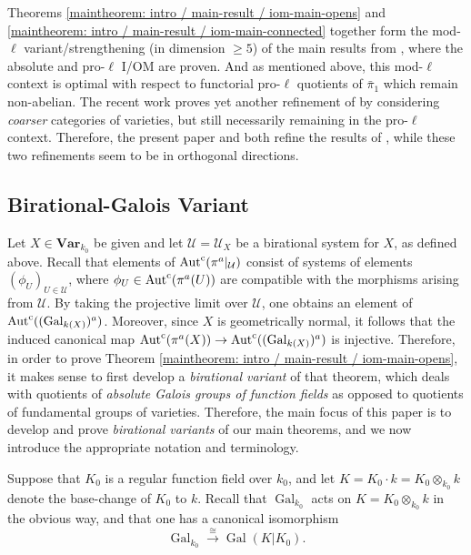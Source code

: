 \documentclass[11pt]{amsart}
\theoremstyle{definition}
\theoremstyle{remark}
\numberwithin{equation}{section}
\DeclareMathOperator{\Aut}{Aut}
\DeclareMathOperator{\Gal}{Gal}
\newcommand{\Ucal}{\mathcal{U}}
\newcommand{\Autc}{\Aut^{\rm c}}
\newcommand{\Var}{\mathbf{Var}}
\newcommand{\Galk}{{\Gal_{k_0}}}
\begin{document}
Theorems \ref{maintheorem: intro / main-result / iom-main-opens} and \ref{maintheorem: intro / main-result / iom-main-connected} together form the mod-$\ell$ variant/strengthening (in dimension $\geq 5$) of the main results from \cite{Pop:2014}, where the absolute and pro-$\ell$ I/OM are proven.
And as mentioned above, this mod-$\ell$ context is optimal with respect to functorial pro-$\ell$ quotients of $\bar\pi_1$ which remain non-abelian.
The recent work \cite{Pop:2016} proves yet another refinement of \cite{Pop:2014} by considering \emph{coarser} categories of varieties, but still necessarily remaining in the pro-$\ell$ context.
Therefore, the present paper and \cite{Pop:2016} both refine the results of \cite{Pop:2014}, while these two refinements seem to be in orthogonal directions.

\subsection{Birational-Galois Variant}
\label{subsection: intro / galois-variant}

Let $X \in \Var_{k_0}$ be given and let $\Ucal = \Ucal_X$ be a birational system for $X$, as defined above.
Recall that elements of $\Autc(\pi^a|_\Ucal)$ consist of systems of elements $(\phi_U)_{U \in \Ucal}$, where $\phi_U \in \Autc(\pi^a(U))$ are compatible with the morphisms arising from $\Ucal$.
By taking the projective limit over $\Ucal$, one obtains an element of $\Autc((\Gal_{k(X)})^a)$.
Moreover, since $X$ is geometrically normal, it follows that the induced canonical map $\Autc(\pi^a(X)) \rightarrow \Autc((\Gal_{k(X)})^a)$ is injective.
Therefore, in order to prove Theorem \ref{maintheorem: intro / main-result / iom-main-opens}, it makes sense to first develop a \emph{birational variant} of that theorem, which deals with quotients of \emph{absolute Galois groups of function fields} as opposed to quotients of fundamental groups of varieties.
Therefore, the main focus of this paper is to develop and prove \emph{birational variants} of our main theorems, and we now introduce the appropriate notation and terminology.

Suppose that $K_0$ is a regular function field over $k_0$, and let $K = K_0 \cdot k = K_0 \otimes_{k_0} k$ denote the base-change of $K_0$ to $k$.
Recall that $\Galk$ acts on $K = K_0 \otimes_{k_0} k$ in the obvious way, and that one has a canonical isomorphism
\[ \Galk \xrightarrow{\cong} \Gal(K|K_0). \]
\end{document}
